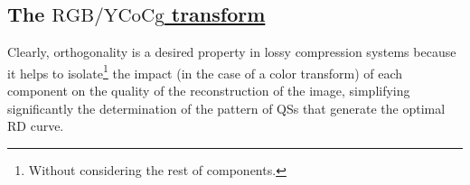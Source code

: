 \begin{comment}
Unfortunately, the RGB-to-YCrCb transform is not orthogonal (for
example, in Eq.~\ref{eq:YCrCb_analysis}, the value of Cr depends on the
value of Y, and therefore, there is a dependency between both
\href{https://en.wikipedia.org/wiki/Basis_(linear_algebra)}{basis})\footnote{This
can be also seen computing the
\href{https://en.wikipedia.org/wiki/Dot_product}{inner product} of the
basis functions of the analysis transform (only the inner product of
orthogonal vectors is 0). Thus, for example, the product of the basis
functions for Y and Cr is $0.299\times 0.5+0.587\times (-0.4187) +
0.144\times (-0.0813) = -0.1055451$.} and therefore neither the RGB
and the YCrCb spaces. This dificults the finding of
$\Delta^*_{\text{Y}}$, $\Delta^*_{\text{Cr}}$, and
$\Delta^*_{\text{Cb}}$ because the quantization error generated in one
of the components influences the quantization error of the rest of
components, and when this happens, we cannot use CS-RS-QS.

Anyway, as you can see in this
\href{https://github.com/Sistemas-Multimedia/Sistemas-Multimedia.github.io/blob/master/study_guide/06-color_transform/performance.ipynb}{notebook},
the use of the YCrCb color domain can be beneficial, even using a
simple quantization strategy such as
\begin{equation}
  \Delta_{\text{Y}} = \Delta_{\text{Cr}} = \Delta_{\text{Cb}}.
\end{equation}
As it can be seen, the RD curves can be improved for most bit-rates,
and therefore, it can be an interesting tool for removing the
intercomponent redundancy from a pure mathematical point of view.
\end{comment}

\subsection{The \href{https://en.wikipedia.org/wiki/YCoCg}{$\text{RGB/YCoCg}$ transform}}
Clearly, orthogonality is a desired property in lossy compression
systems because it helps to isolate\footnote{Without considering the
rest of components.} the impact (in the case of a color transform) of
each component on the quality of the reconstruction of the image,
simplifying significantly the determination of the pattern of QSs that
generate the optimal RD curve.

